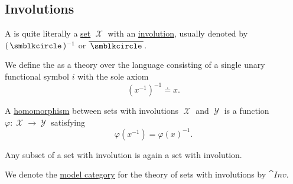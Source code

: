\subsection{Involutions}\label{subsec:involutions}

\begin{definition}\label{def:set_with_involution}
  A  is quite literally a \hyperref[def:set_zfc]{set} \( \mscrX \) with an \hyperref[def:function/involution]{involution}, usually denoted by \( (\placeholder)^{-1} \) or \( \overline \placeholder \).

  \begin{thmenum}
     We define the  as a theory over the language consisting of a single unary functional symbol \( i \) with the sole axiom
    \begin{equation}\label{eq:def:set_with_involution/theory/axiom}
      (x^{-1})^{-1} \doteq x.
    \end{equation}

     A \hyperref[def:first_order_homomorphism]{homomorphism} between sets with involutions \( \mscrX \) and \( \mscrY \) is a function \( \varphi: \mscrX \to \mscrY \) satisfying
    \begin{equation}\label{eq:def:set_with_involution/homomorphism}
      \varphi(x^{-1})
      =
      \varphi(x)^{-1}.
    \end{equation}

     Any subset of a set with involution is again a set with involution.

     We denote the \hyperref[def:first_order_model_category]{model category} for the theory of sets with involutions by \( \cat{Inv} \).
  \end{thmenum}
\end{definition}
